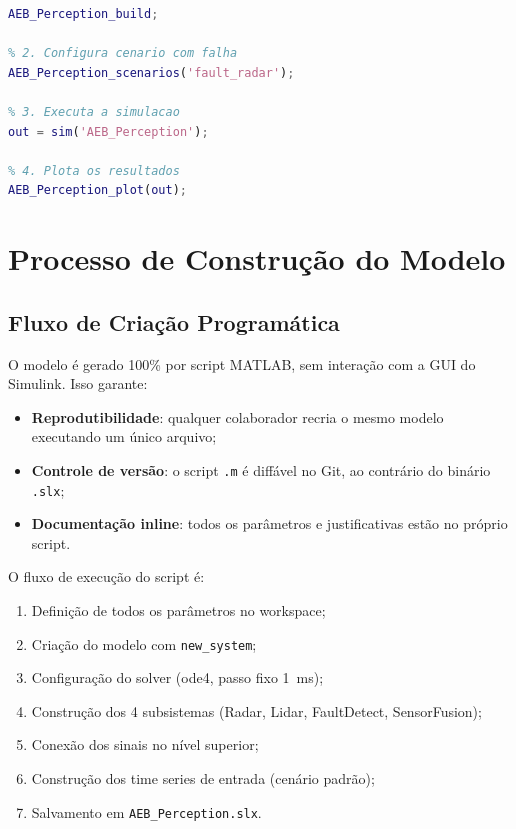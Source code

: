 \documentclass[12pt,a4paper]{article}
\begin{document}
\begin{codigobox}[title=Exemplo de uso: cen\'ario com injeção de falha]
\begin{lstlisting}[language=Matlab, numbers=none]
% 1. Gera o modelo (apenas na primeira vez)
AEB_Perception_build;

% 2. Configura cenario com falha
AEB_Perception_scenarios('fault_radar');

% 3. Executa a simulacao
out = sim('AEB_Perception');

% 4. Plota os resultados
AEB_Perception_plot(out);
\end{lstlisting}
\end{codigobox}

\section{Processo de Constru\c{c}\~ao do Modelo}

\subsection{Fluxo de Cria\c{c}\~ao Programática}

O modelo \'e gerado 100\% por script MATLAB, sem intera\c{c}\~ao com a GUI do
Simulink. Isso garante:
\begin{itemize}
  \item \textbf{Reprodutibilidade}: qualquer colaborador recria o mesmo modelo
    executando um \'unico arquivo;
  \item \textbf{Controle de vers\~ao}: o script \texttt{.m} \'e diff\'avel no Git,
    ao contr\'ario do bin\'ario \texttt{.slx};
  \item \textbf{Documenta\c{c}\~ao inline}: todos os par\^ametros e justificativas
    est\~ao no pr\'oprio script.
\end{itemize}

O fluxo de execu\c{c}\~ao do script \'e:

\begin{enumerate}
  \item Defini\c{c}\~ao de todos os par\^ametros no workspace;
  \item Cria\c{c}\~ao do modelo com \texttt{new\_system};
  \item Configura\c{c}\~ao do solver (ode4, passo fixo 1~ms);
  \item Constru\c{c}\~ao dos 4 subsistemas (Radar, Lidar, FaultDetect, SensorFusion);
  \item Conex\~ao dos sinais no n\'ivel superior;
  \item Constru\c{c}\~ao dos time series de entrada (cen\'ario padr\~ao);
  \item Salvamento em \texttt{AEB\_Perception.slx}.
\end{enumerate}
\end{document}
